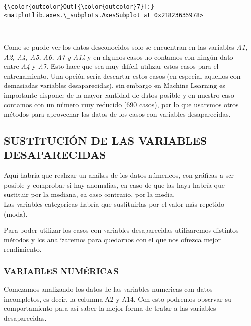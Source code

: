 \documentclass[11pt]{article}
\begin{document}
\begin{Verbatim}[commandchars=\\\{\}]
{\color{outcolor}Out[{\color{outcolor}7}]:} <matplotlib.axes.\_subplots.AxesSubplot at 0x21823635978>
\end{Verbatim}
            
    \begin{center}
    \end{center}
    { \hspace*{\fill} \\}
    
    Como se puede ver los datos desconocidos solo se encuentran en las
variables \emph{A1, A2, A4, A5, A6, A7 y A14} y en algunos casos no
contamos con ningún dato entre \emph{A4} y \emph{A7}. Esto hace que sea
muy difícil utilizar estos casos para el entrenamiento. Una opción sería
descartar estos casos (en especial aquellos con demasiadas variables
desaparecidas), sin embargo en Machine Learning es importante disponer
de la mayor cantidad de datos posible y en nuestro caso contamos con un
número muy reducido (690 casos), por lo que usaremos otros métodos para
aprovechar los datos de los casos con variables desaparecidas.

    \subsection{SUSTITUCIÓN DE LAS VARIABLES
DESAPARECIDAS}\label{sustituciuxf3n-de-las-variables-desaparecidas}

    Aquí habría que realizar un análsis de los datos númericos, con gráficas
a ser posible y comprobar si hay anomalias, en caso de que las haya
habría que sustituir por la mediana, en caso contrario, por la media.\\
Las variables categoricas habría que sustituirlas por el valor más
repetido (moda).

    Para poder utilizar los casos con variables desaparecidas utilizaremos
distintos métodos y los analizaremos para quedarnos con el que nos
ofrezca mejor rendimiento.

    \subsubsection{VARIABLES NUMÉRICAS}\label{variables-numuxe9ricas}

    Comezamos analizando los datos de las variables numéricas con datos
incompletos, es decir, la columna A2 y A14. Con esto podremos observar
su comportamiento para así saber la mejor forma de tratar a las
variables desaparecidas.
\end{document}
